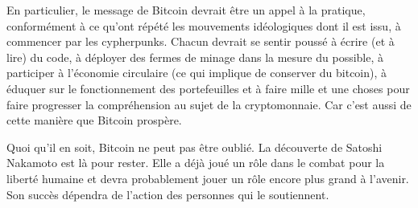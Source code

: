 En particulier, le message de Bitcoin devrait être un appel à la pratique, conformément à ce qu'ont répété les mouvements idéologiques dont il est issu, à commencer par les cypherpunks. Chacun devrait se sentir poussé à écrire (et à lire) du code, à déployer des fermes de minage dans la mesure du possible, à participer à l'économie circulaire (ce qui implique de conserver du bitcoin), à éduquer sur le fonctionnement des portefeuilles et à faire mille et une choses pour faire progresser la compréhension au sujet de la cryptomonnaie. Car c'est aussi de cette manière que Bitcoin prospère.

Quoi qu'il en soit, Bitcoin ne peut pas être oublié. La découverte de Satoshi Nakamoto est là pour rester. Elle a déjà joué un rôle dans le combat pour la liberté humaine et devra probablement jouer un rôle encore plus grand à l'avenir. Son succès dépendra de l'action des personnes qui le soutiennent.
